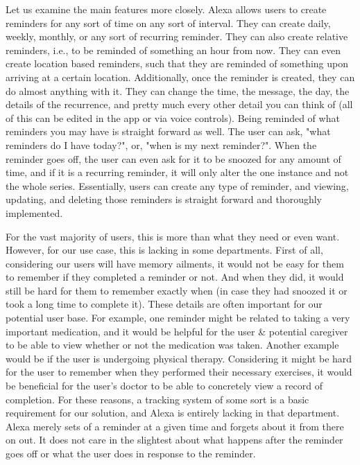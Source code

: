 \documentclass[conference]{IEEEtran}
\begin{document}
Let us examine the main features more closely. 
Alexa allows users to create reminders for any sort of time on any sort of interval. 
They can create daily, weekly, monthly, or any sort of recurring reminder. 
They can also create relative reminders, i.e., to be reminded of something an hour from now. 
They can even create location based reminders, such that they are reminded of something upon arriving at a certain location. 
Additionally, once the reminder is created, they can do almost anything with it. 
They can change the time, the message, the day, the details of the recurrence, and pretty much every other detail you can think of (all of this can be edited in the app or via voice controls).
Being reminded of what reminders you may have is straight forward as well. The user can ask, "what reminders do I have today?", or, "when is my next reminder?". 
When the reminder goes off, the user can even ask for it to be snoozed for any amount of time, and if it is a recurring reminder, it will only alter the one instance and not the whole series. 
Essentially, users can create any type of reminder, and viewing, updating, and deleting those reminders is straight forward and thoroughly implemented.  

For the vast majority of users, this is more than what they need or even want. 
However, for our use case, this is lacking in some departments. 
First of all, considering our users will have memory ailments, it would not be easy for them to remember if they completed a reminder or not. 
And when they did, it would still be hard for them to remember exactly when (in case they had snoozed it or took a long time to complete it).
These details are often important for our potential user base. 
For example, one reminder might be related to taking a very important medication, and it would be helpful for the user \& potential caregiver to be able to view whether or not the medication was taken. 
Another example would be if the user is undergoing physical therapy. Considering it might be hard for the user to remember when they performed their necessary exercises, it would be beneficial for the user's doctor to be able to concretely view a record of completion. 
For these reasons, a tracking system of some sort is a basic requirement for our solution, and Alexa is entirely lacking in that department. 
Alexa merely sets of a reminder at a given time and forgets about it from there on out. 
It does not care in the slightest about what happens after the reminder goes off or what the user does in response to the reminder. 
\end{document}
